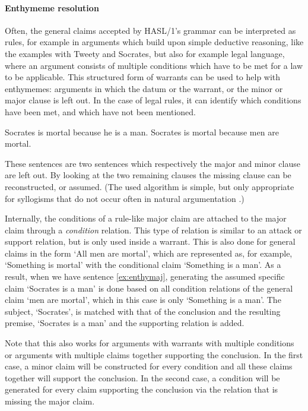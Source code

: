 \paragraph{Enthymeme resolution}
Often, the general claims accepted by HASL/1's grammar can be interpreted as rules, for example in arguments which build upon simple deductive reasoning, like the examples with Tweety and Socrates, but also for example legal language, where an argument consists of multiple conditions which have to be met for a law to be applicable. This structured form of warrants can be used to help with enthymemes: arguments in which the datum or the warrant, or the minor or major clause is left out. In the case of legal rules, it can identify which conditions have been met, and which have not been mentioned.

\begin{exe}
	\ex\label{ex:enthymin} Socrates is mortal because he is a man.
	\ex\label{ex:enthymaj} Socrates is mortal because men are mortal.
\end{exe}

\noindent These sentences are two sentences which respectively the major and minor clause are left out. By looking at the two remaining clauses the missing clause can be reconstructed, or assumed. (The used algorithm is simple, but only appropriate for syllogisms that do not occur often in natural argumentation \cite{saintDizierStede2017}.)

Internally, the conditions of a rule-like major claim are attached to the major claim through a \emph{condition} relation. This type of relation is similar to an attack or support relation, but is only used inside a warrant. This is also done for general claims in the form `All men are mortal', which are represented as, for example, `Something is mortal' with the conditional claim `Something is a man'. As a result, when we have sentence \ref{ex:enthymaj}, generating the assumed specific claim `Socrates is a man' is done based on all condition relations of the general claim `men are mortal', which in this case is only `Something is a man'. The subject, `Socrates', is matched with that of the conclusion and the resulting premise, `Socrates is a man' and the supporting relation is added.

Note that this also works for arguments with warrants with multiple conditions or arguments with multiple claims together supporting the conclusion. In the first case, a minor claim will be constructed for every condition and all these claims together will support the conclusion. In the second case, a condition will be generated for every claim supporting the conclusion via the relation that is missing the major claim.

